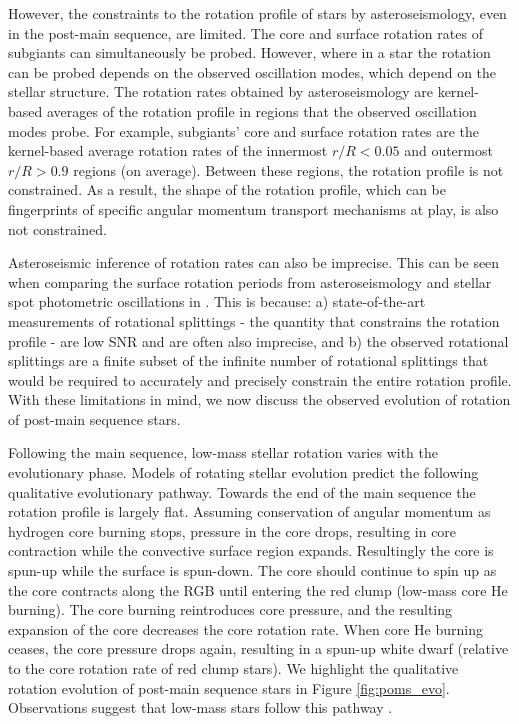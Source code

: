 However, the constraints to the rotation profile of stars by asteroseismology, even in the post-main sequence, are limited.
The core and surface rotation rates of subgiants can simultaneously be probed.
However, where in a star the rotation can be probed depends on the observed oscillation modes, which depend on the stellar structure.
The rotation rates obtained by asteroseismology are kernel-based averages of the rotation profile in regions that the observed oscillation modes probe.
For example, subgiants' core and surface rotation rates are the kernel-based average rotation rates of the innermost $r/R<0.05$ and outermost $r/R>0.9$ regions (on average).
Between these regions, the rotation profile is not constrained.
As a result, the shape of the rotation profile, which can be fingerprints of specific angular momentum transport mechanisms at play, is also not constrained.

Asteroseismic inference of rotation rates can also be imprecise.
This can be seen when comparing the surface rotation periods from asteroseismology and stellar spot photometric oscillations in \citet{hall_weakened_2021}.
This is because: a) state-of-the-art measurements of rotational splittings - the quantity that constrains the rotation profile - are low SNR and are often also imprecise, and b) the observed rotational splittings are a finite subset of the infinite number of rotational splittings that would be required to accurately and precisely constrain the entire rotation profile.
With these limitations in mind, we now discuss the observed evolution of rotation of post-main sequence stars.

Following the main sequence, low-mass stellar rotation varies with the evolutionary phase.
Models of rotating stellar evolution \citep[see, e.g.,][]{maeder_evolution_2000,heger_presupernova_2000} predict the following qualitative evolutionary pathway.
Towards the end of the main sequence the rotation profile is largely flat.
Assuming conservation of angular momentum as hydrogen core burning stops, pressure in the core drops, resulting in core contraction while the convective surface region expands.
Resultingly the core is spun-up while the surface is spun-down.
The core should continue to spin up as the core contracts along the RGB until entering the red clump (low-mass core He burning).
The core burning reintroduces core pressure, and the resulting expansion of the core decreases the core rotation rate.
When core He burning ceases, the core pressure drops again, resulting in a spun-up white dwarf (relative to the core rotation rate of red clump stars).
We highlight the qualitative rotation evolution of post-main sequence stars in Figure \ref{fig:poms_evo}.
Observations suggest that low-mass stars follow this pathway \citep{mosser_spin_2012,deheuvels_seismic_2014,deheuvels_seismic_2015,hermes_white_2017,gehan_core_2018,deheuvels_seismic_2020}.

